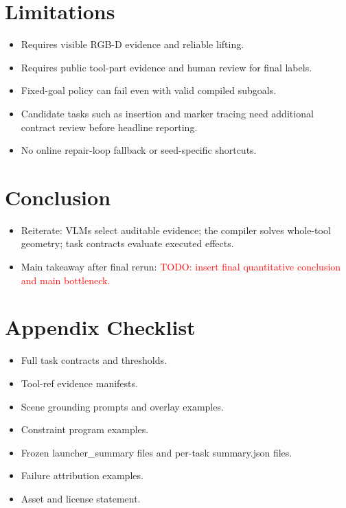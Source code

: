 \documentclass[journal]{IEEEtran}
\newcommand{\todo}[1]{\textcolor{red}{TODO: #1}}
\begin{document}
\section{Limitations}
\begin{itemize}
  \item Requires visible RGB-D evidence and reliable lifting.
  \item Requires public tool-part evidence and human review for final labels.
  \item Fixed-goal policy can fail even with valid compiled subgoals.
  \item Candidate tasks such as insertion and marker tracing need additional
  contract review before headline reporting.
  \item No online repair-loop fallback or seed-specific shortcuts.
\end{itemize}

\section{Conclusion}
\begin{itemize}
  \item Reiterate: VLMs select auditable evidence; the compiler solves
  whole-tool geometry; task contracts evaluate executed effects.
  \item Main takeaway after final rerun:
  \todo{insert final quantitative conclusion and main bottleneck.}
\end{itemize}

\section*{Appendix Checklist}
\begin{itemize}
  \item Full task contracts and thresholds.
  \item Tool-ref evidence manifests.
  \item Scene grounding prompts and overlay examples.
  \item Constraint program examples.
  \item Frozen launcher\_summary files and per-task summary.json files.
  \item Failure attribution examples.
  \item Asset and license statement.
\end{itemize}
\end{document}

